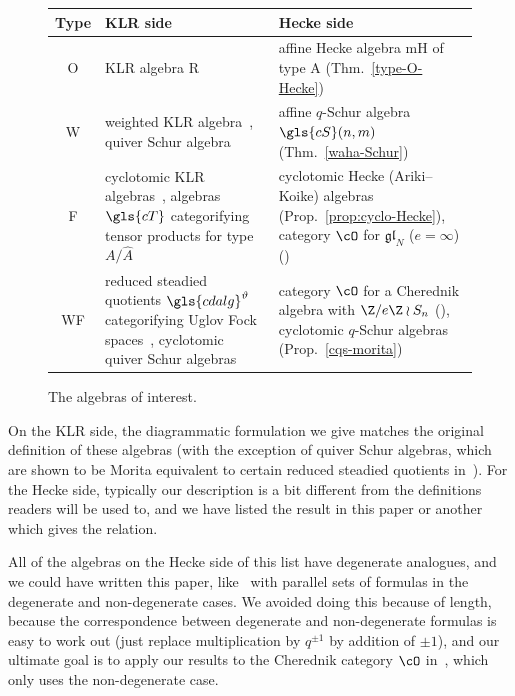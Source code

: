 \begin{figure}[htb]\label{table-of-algebras} \centering
\renewcommand{\arraystretch}{1.4}
 \begin{tabular}{|c|p{43mm}|p{68mm}|} 
 \hline
 Type& KLR side & Hecke side \\
\hline 
O&KLR algebra \gls{R}~\cite{KLI,Rou2KM}
& affine Hecke algebra \gls{mH} of type A (Thm.~\ref{type-O-Hecke})\\ 
\hline
W& weighted KLR algebra~\cite{WebwKLR}, quiver Schur algebra~\cite{SWschur} & 
affine $q$-Schur algebra $\gls{cS}(n,m)$ (Thm.~\ref{waha-Schur})\\ 
\hline
F& cyclotomic KLR algebras~\cite{KLI}, algebras $\gls{cT}$ categorifying tensor products 
for type $A/\hat{A}$~\cite{Webmerged} &
cyclotomic Hecke (Ariki--Koike) algebras (Prop.~\ref{prop:cyclo-Hecke}), 
category $\cO$ for $\mathfrak{gl}_N$ ($e=\infty$) (\cite[9.11]{Webmerged})\\ 
\hline
WF& reduced steadied quotients $\gls{cdalg}^\vartheta$ categorifying Uglov Fock spaces~\cite{WebRou}, cyclotomic quiver Schur algebras~\cite{SWschur}&
 category $\cO$ for a
Cherednik algebra with $\Z/e\Z\wr S_n$ (\cite[Thm.~A]{WebRou}),
cyclotomic $q$-Schur algebras (Prop.~\ref{cqs-morita}) \\ 
\hline
\end{tabular}
\caption{The algebras of interest.}
\end{figure}
 
 
 
On the KLR side, the diagrammatic formulation we give matches the
original definition of these algebras (with the exception of quiver
Schur algebras, which are shown to be Morita equivalent to certain
reduced steadied quotients in~\cite[Th.~3.9]{WebwKLR}). For
the Hecke side, typically our description is a bit different from the
definitions readers will be used to, and we have
listed the result in this paper or another which gives the relation.

\begin{rema}
 All of the algebras on the Hecke side of this list have degenerate
 analogues, and we could have written this paper, like~\cite{BKKL}
 with parallel sets of formulas in the degenerate and non-degenerate
 cases. We avoided doing this because of length, because the correspondence between
 degenerate and non-degenerate formulas is easy to work out (just replace
 multiplication by $q^{\pm 1}$ by addition of $\pm 1$), and our
 ultimate goal is to apply our results to the Cherednik category
 $\cO$ in~\cite{WebRou},
 which only uses the non-degenerate case. 
\end{rema}

